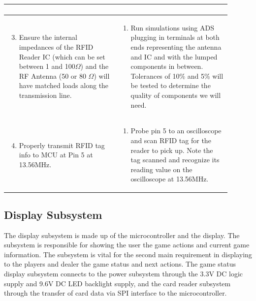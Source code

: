 \documentclass[12pt]{article}
\begin{document}
\begin{table}[!h]
\begin{tabular}{| p{0.45\linewidth} | p{0.45\linewidth} |}
\begin{enumerate}[label=\alph*)]
		\end{enumerate} \\
		\hline
		\begin{enumerate}
		\setcounter{enumi}{2}
 			\item Ensure the internal impedances of the RFID Reader IC (which can be set between 1 and 100$\Omega$) and the RF Antenna (50 or 80 $\Omega$) will have matched loads along the transmission line.
		\end{enumerate} & \begin{enumerate}[label=\alph*)]
 			\item Run simulations using ADS plugging in terminals at both ends representing the antenna and IC and with the lumped components in between. Tolerances of 10\% and 5\% will be tested to determine the quality of components we will need.
		\end{enumerate} \\
		\hline
		\begin{enumerate}
		\setcounter{enumi}{3}
 			\item Properly transmit RFID tag info to MCU at Pin 5 at 13.56MHz.
		\end{enumerate} & \begin{enumerate}[label=\alph*)]
 			\item Probe pin 5 to an oscilloscope and scan RFID tag for the reader to pick up. Note the tag scanned and recognize its reading value on the oscilloscope at 13.56MHz.
		\end{enumerate} \\
		\hline
	\end{tabular}
\end{table}

\subsection{Display Subsystem}

The display subsystem is made up of the microcontroller and the display. The subsystem is responsible for showing the user the game actions and current game information. The subsystem is vital for the second main requirement in displaying to the players and dealer the game status and next actions. The game status display subsystem connects to the power subsystem through the 3.3V DC logic supply and 9.6V DC LED backlight supply, and the card reader subsystem through the transfer of card data via SPI interface to the microcontroller.
\end{document}
